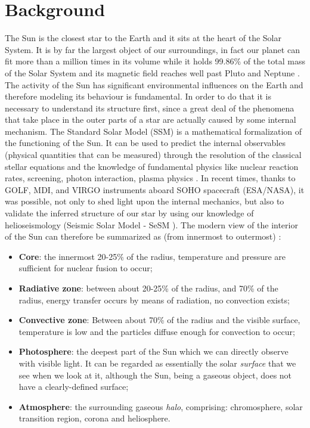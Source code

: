 \chapter{Background}
\label{capitolo2}
\thispagestyle{empty}


\noindent The Sun is the closest star to the Earth and it sits at the heart of the Solar System. It is by far the largest object of our surroundings, in fact our planet can fit more than a million times in its volume \cite{Laclare1996} while it holds 99.86\% of the total mass of the Solar System \cite{astro-const} and its magnetic field reaches well past Pluto and Neptune \cite{nasa-sun-earth}. The activity of the Sun has significant environmental influences on the Earth and therefore modeling its behaviour is fundamental. In order to do that it is necessary to understand its structure first, since a great deal of the phenomena that take place in the outer parts of a star are actually caused by some internal mechanism. The Standard Solar Model (SSM) \cite{ssm} is a mathematical formalization of the functioning of the Sun. It can be used to predict the internal observables (physical quantities that can be measured) through the resolution of the classical stellar equations and the knowledge of fundamental physics like nuclear reaction rates, screening, photon interaction, plasma physics \cite{ssmb}. In recent times, thanks to GOLF, MDI, and VIRGO instruments aboard SOHO \cite{soho} spacecraft (ESA/NASA), it was possible, not only to shed light upon the internal mechanics, but also to validate the inferred structure of our star by using our knowledge of helioseismology (Seismic Solar Model - SeSM \cite{sesm}). The modern view of the interior of the Sun can therefore be summarized as (from innermost to outermost) \cite{sstruct}:
\begin{itemize}
    \item \textbf{Core}: the innermost 20-25\% of the radius, temperature and pressure are sufficient for nuclear fusion to occur;
    \item  \textbf{Radiative zone}: between about 20-25\% of the radius, and 70\% of the radius, energy transfer occurs by means of radiation, no convection exists;
    \item \textbf{Convective zone}: Between about 70\% of the radius and the visible surface, temperature is low and the particles diffuse enough for convection to occur;
    \item \textbf{Photosphere}: the deepest part of the Sun which we can directly observe with visible light. It can be regarded as essentially the solar \textit{surface} that we see when we look at it, although the Sun, being a gaseous object, does not have a clearly-defined surface;
    \item \textbf{Atmosphere}: the surrounding gaseous \textit{halo}, comprising: chromosphere, solar transition region, corona and heliosphere.
\end{itemize}
